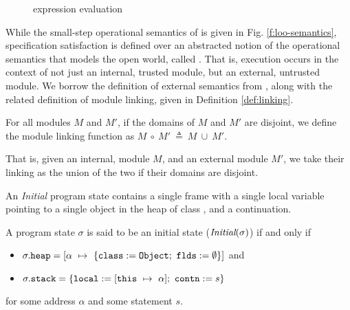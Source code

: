 \begin{figure}[t]
\begin{minipage}{\textwidth}
\begin{minipage}{\textwidth}
\caption{\Loo expression evaluation}
\label{f:evaluation}
\end{minipage}
\end{minipage}
\end{figure}

While the small-step operational semantics of \Loo is given in Fig. \ref{f:loo-semantics},
specification satisfaction is defined over an abstracted notion of 
the operational semantics that models the open world, called . 
That is, execution occurs in the context of not just an internal, trusted module, but 
an external, untrusted module. We borrow the definition of external  semantics 
from \citeauthor{FASE}, along with the related definition of module linking, given in Definition \ref{def:linking}.
\begin{definition}
\label{def:linking}
For all modules $M$ and $M'$, if the domains of $M$ and $M'$ are disjoint, 
we define the module linking function as $M\ \circ\ M'\ \triangleq\ M\ \cup\ M'$.
\end{definition}
That is, given an internal, module $M$, and an external module $M'$, 
we take their linking as the union of the two if their domains are disjoint.



An \emph{Initial} program state contains a single frame 
with a single local variable  pointing to a single object 
in the heap of class , and a continuation.
\begin{definition}
\label{def:initial}
A program state $\sigma$ is said to be an initial state ($\textit{Initial}(\sigma)$)
if and only if
\begin{itemize}
\item
$\sigma.\prg{heap} = [\alpha\ \mapsto\ \{\prg{class}:=\prg{Object};\ \prg{flds}:=\emptyset\}]$ and
\item
$\sigma.{\texttt{stack}} = \{{\texttt{local}}:=[{\texttt{this}}\ \mapsto\ \alpha];\ {\texttt{contn}}:= s\}$
\end{itemize} 
for some address $\alpha$ and some statement $s$.
\end{definition}


